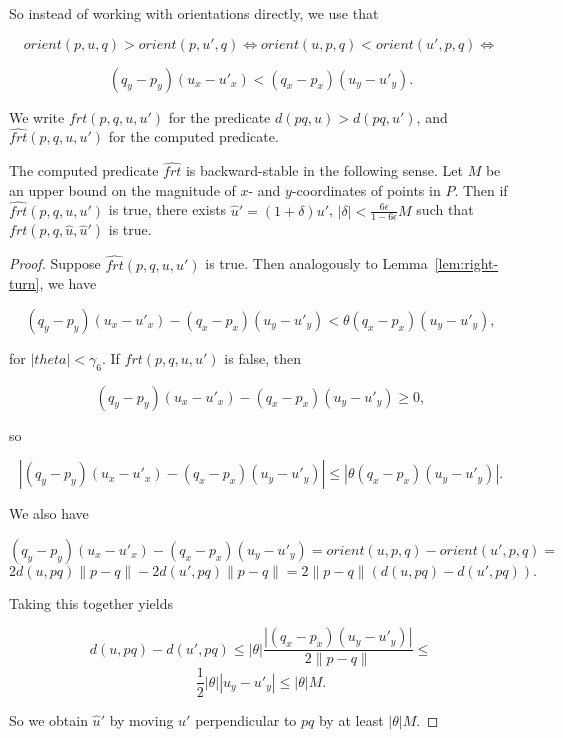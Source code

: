 So instead of working with orientations directly, we use that

$$orient(p, u, q) > orient(p, u', q) \iff orient(u, p, q) < orient(u', p, q) 
\iff$$

$$(q_y - p_y) (u_x - u'_x) < (q_x - p_x) (u_y - u'_y).$$

We write $frt(p, q, u, u')$ for the predicate $d(pq, u) > d(pq, u')$,
and $\widehat{frt}(p, q, u, u')$ for the computed predicate.

\begin{lemma}\label{lem:farther}
    The computed predicate $\widehat{frt}$ is backward-stable in the 
    following sense. Let $M$ be an upper bound on the magnitude of 
    $x$- and $y$-coordinates of points in $P$. 
    Then if $\widehat{frt}(p, q, u, u')$ is true, there exists 
    $\hat{u}' = (1 + \delta)u'$, $|\delta| < \frac{6\epsilon}{1 - 6\epsilon}M$
    such that $frt(p, q, \hat{u}, \hat{u}')$ is true.
\end{lemma}

\begin{proof}
    Suppose $\widehat{frt}(p, q, u, u')$ is true. Then analogously to 
    Lemma~\ref{lem:right-turn}, we have

    $$(q_y - p_y) (u_x - u'_x) - (q_x - p_x) (u_y - u'_y) < 
            \theta(q_x - p_x) (u_y - u'_y),$$

    for $|theta| < \gamma_6$. If $frt(p, q, u, u')$ is false, then

    $$(q_y - p_y) (u_x - u'_x) - (q_x - p_x) (u_y - u'_y) \geq 0,$$

    so 

    $$|(q_y - p_y) (u_x - u'_x) - (q_x - p_x) (u_y - u'_y)| \leq 
        |\theta(q_x - p_x) (u_y - u'_y)|. $$

    We also have 

    $$(q_y - p_y) (u_x - u'_x) - (q_x - p_x) (u_y - u'_y) =
       orient(u, p, q) - orient(u', p, q) = $$
    $$2 d(u, pq) \lVert p - q \rVert - 2 d(u', pq) \lVert p - q \rVert = 
        2 \lVert p - q \rVert (d(u, pq) - d(u', pq)). $$

    Taking this together yields

    $$d(u, pq) - d(u', pq) \leq 
       |\theta|\frac{|(q_x - p_x) (u_y - u'_y)|}{2 \lVert p - q \rVert} \leq$$
    $$\frac{1}{2}|\theta| |u_y - u'_y| \leq |\theta|M.$$

    So we obtain $\hat{u}'$ by moving $u'$ perpendicular to $pq$ by at least
    $|\theta|M$.
\end{proof}

